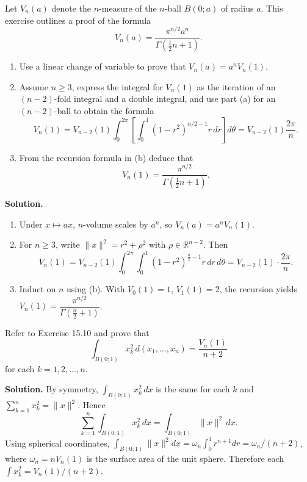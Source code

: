 \begin{problembox}
Let \( V_n(a) \) denote the \( n \)-measure of the \( n \)-ball \( B(0; a) \) of radius \( a \). This exercise outlines a proof of the formula
\[
V_n(a) = \frac{\pi^{n/2} a^n}{\Gamma( \frac{1}{2} n + 1 )}.
\]
\begin{enumerate}[label=(\alph*)]
\item Use a linear change of variable to prove that \( V_n(a) = a^n V_n(1) \).
\item Assume \( n \geq 3 \), express the integral for \( V_n(1) \) as the iteration of an \( (n - 2) \)-fold integral and a double integral, and use part (a) for an \( (n - 2) \)-ball to obtain the formula
\[
V_n(1) = V_{n-2}(1) \int_0^{2\pi} \left[ \int_0^1 (1 - r^2)^{n/2 - 1}r \, dr \right] d\theta = V_{n-2}(1) \frac{2\pi}{n}.
\]
\item From the recursion formula in (b) deduce that
\[
V_n(1) = \frac{\pi^{n/2}}{\Gamma(\frac{1}{2}n + 1)}.
\]
\end{enumerate}
\end{problembox}

\noindent\textbf{Solution.}
\begin{enumerate}[label=(\alph*)]
\item Under \(x\mapsto ax\), \(n\)-volume scales by \(a^n\), so \(V_n(a)=a^n V_n(1)\).
\item For \(n\ge 3\), write \(\|x\|^2=r^2+\rho^2\) with \(\rho\in\mathbb{R}^{n-2}\). Then
\[
V_n(1)=V_{n-2}(1)\int_0^{2\pi}\!\int_0^1 (1-r^2)^{\frac{n}{2}-1} r\,dr\,d\theta = V_{n-2}(1)\cdot \frac{2\pi}{n}.
\]
\item Induct on \(n\) using (b). With \(V_0(1)=1\), \(V_1(1)=2\), the recursion yields \(V_n(1)=\dfrac{\pi^{n/2}}{\Gamma(\tfrac{n}{2}+1)}\).
\end{enumerate}

\begin{problembox}
Refer to Exercise 15.10 and prove that
\[
\int_{B(0;1)} x_k^2 \, d(x_1, \ldots, x_n) = \frac{V_n(1)}{n + 2}
\]
for each \( k = 1, 2, \ldots, n \).
\end{problembox}

\noindent\textbf{Solution.}
By symmetry, \(\int_{B(0;1)} x_k^2\,dx\) is the same for each \(k\) and \(\sum_{k=1}^n x_k^2=\|x\|^2\). Hence
\[
\sum_{k=1}^n \int_{B(0;1)} x_k^2\,dx = \int_{B(0;1)} \|x\|^2\,dx.
\]
Using spherical coordinates, \(\int_{B(0;1)} \|x\|^2 dx = \omega_{n}\int_0^1 r^{n+1}dr=\omega_n/(n+2)\), where \(\omega_n= n V_n(1)\) is the surface area of the unit sphere. Therefore each \(\int x_k^2 = V_n(1)/(n+2)\).

